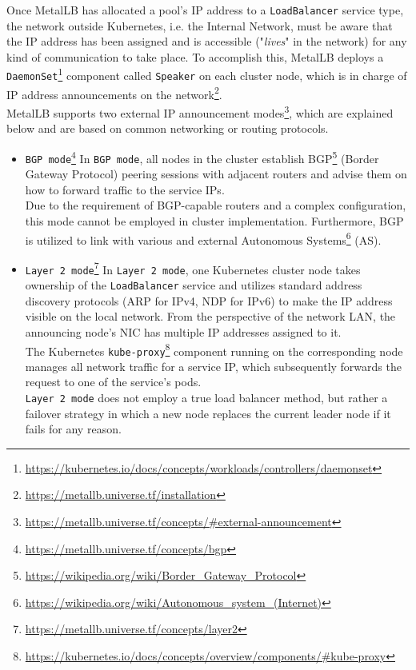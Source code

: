 Once MetalLB has allocated a pool's IP address to a \texttt{LoadBalancer}
service type, the network outside Kubernetes, i.e. the Internal Network, must be
aware that the IP address has been assigned and is accessible ("\textit{lives}"
in the network) for any kind of communication to take place. To accomplish this,
MetalLB deploys a \texttt{DaemonSet}\footnote{\url{https://kubernetes.io/docs/concepts/workloads/controllers/daemonset}}
component called \texttt{Speaker} on each cluster node, which is in charge of IP
address announcements on the network\footnote{\url{https://metallb.universe.tf/installation}}.
\\ %
MetalLB supports two external IP announcement modes\footnote{\url{https://metallb.universe.tf/concepts/\#external-announcement}},
which are explained below and are based on common networking or routing protocols.
\begin{itemize}
  \item \texttt{BGP mode}\footnote{\url{https://metallb.universe.tf/concepts/bgp}}
    \newline
    In \texttt{BGP mode}, all nodes in the cluster establish BGP\footnote{\url{https://wikipedia.org/wiki/Border_Gateway_Protocol}}
    (Border Gateway Protocol) peering sessions with adjacent routers and advise
    them on how to forward traffic to the service IPs. \\ %
    Due to the requirement of BGP-capable routers and a complex configuration, this
    mode cannot be employed in cluster implementation. Furthermore, BGP is utilized
    to link with various and external Autonomous Systems\footnote{\url{https://wikipedia.org/wiki/Autonomous_system_(Internet)}}
    (AS).

  \item \texttt{Layer 2 mode}\footnote{\url{https://metallb.universe.tf/concepts/layer2}}
    \newline
    In \texttt{Layer 2 mode}, one Kubernetes cluster node takes ownership of the
    \texttt{LoadBalancer} service and utilizes standard address discovery protocols
    (ARP for IPv4, NDP for IPv6) to make the IP address visible on the local
    network. From the perspective of the network LAN, the announcing node's NIC
    has multiple IP addresses assigned to it. \\ %
    The Kubernetes \texttt{kube-proxy}\footnote{\url{https://kubernetes.io/docs/concepts/overview/components/\#kube-proxy}}
    component running on the corresponding node manages all network traffic for a
    service IP, which subsequently forwards the request to one of the service's
    pods. \\ %
    \texttt{Layer 2 mode} does not employ a true load balancer method, but
    rather a failover strategy in which a new node replaces the current leader
    node if it fails for any reason.
\end{itemize}
